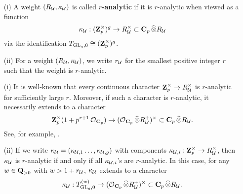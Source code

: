 \begin{Definition}\label{Definition: w-analytic weight}
\begin{enumerate}
\item[(i)] A weight $(R_{\calU}, \kappa_{\calU})$ is called \textbf{$r$-analytic} if it is $r$-analytic when viewed as a function
$$\kappa_{\calU}:(\Z_p^{\times})^g\rightarrow R_{\calU}^{\times}\subset \C_p\widehat{\otimes}R_{\calU}$$
via the identification $T_{\GL_g,0}\cong (\Z_p^{\times})^g$.
\item[(ii)] For a weight $(R_{\calU}, \kappa_{\calU})$, we write $r_{\calU}$ for the smallest positive integer $r$ such that the weight is $r$-analytic.
\end{enumerate}
\end{Definition}

\begin{Remark}
\normalfont \begin{enumerate}
\item[(i)] It is well-known that every continuous character $\Z_p^{\times}\rightarrow R_{\calU}^{\times}$ is $r$-analytic for sufficiently large $r$. Moreover, if such a character is $r$-analytic, it necessarily extends to a character
$$\Z_p^{\times}(1+p^{r+1}\calO_{\C_p})\rightarrow (\calO_{\C_p}\widehat{\otimes}R_{\calU}^+)^{\times}\subset \C_p\widehat{\otimes}R_{\calU}.$$ See, for example, \cite[Proposition 2.6]{CHJ-2017}. 
\item[(ii)] If we write $\kappa_{\calU}=(\kappa_{\calU, 1}\ldots, \kappa_{\calU, g})$ with components $\kappa_{\calU,i}:\Z_p^{\times}\rightarrow R_{\calU}^{\times}$, then $\kappa_{\calU}$ is $r$-analytic if and only if all $\kappa_{\calU,i}$'s are $r$-analytic.
In this case, for any $w\in \Q_{>0}$ with $w>1+r_{\calU}$, $\kappa_{\calU}$ extends to a character
$$\kappa_{\calU}: T^{(w)}_{\GL_g, 0}\rightarrow (\calO_{\C_p}\widehat{\otimes}R_{\calU}^+)^{\times}\subset \C_p\widehat{\otimes}R_{\calU}.$$
\end{enumerate}
\end{Remark}

